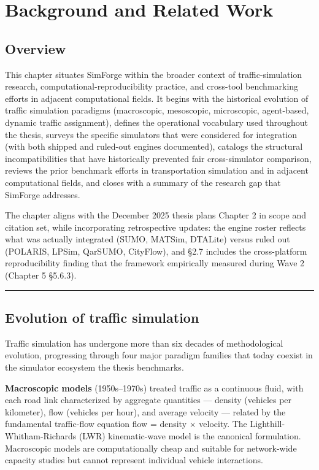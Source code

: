 \chapter{Background and Related
Work}\label{chapter-2-background-and-related-work}

\section{Overview}\label{20-overview}

This chapter situates SimForge within the broader context of
traffic-simulation research, computational-reproducibility practice, and
cross-tool benchmarking efforts in adjacent computational fields. It
begins with the historical evolution of traffic simulation paradigms
(macroscopic, mesoscopic, microscopic, agent-based, dynamic traffic
assignment), defines the operational vocabulary used throughout the
thesis, surveys the specific simulators that were considered for
integration (with both shipped and ruled-out engines documented),
catalogs the structural incompatibilities that have historically
prevented fair cross-simulator comparison, reviews the prior benchmark
efforts in transportation simulation and in adjacent computational
fields, and closes with a summary of the research gap that SimForge
addresses.

The chapter aligns with the December 2025 thesis
plan\textquotesingle s Chapter 2 in scope and citation set, while
incorporating retrospective updates: the engine roster reflects what was
actually integrated (SUMO, MATSim, DTALite) versus ruled out (POLARIS,
LPSim, QarSUMO, CityFlow), and §2.7 includes the cross-platform
reproducibility finding that the framework empirically measured during
Wave 2 (Chapter 5 §5.6.3).

\begin{center}\rule{0.5\linewidth}{0.5pt}\end{center}

\section{Evolution of traffic
simulation}\label{21-evolution-of-traffic-simulation}

Traffic simulation has undergone more than six decades of methodological
evolution, progressing through four major paradigm families that today
coexist in the simulator ecosystem the thesis benchmarks.

\textbf{Macroscopic models} (1950s--1970s) treated traffic as a
continuous fluid, with each road link characterized by aggregate
quantities --- density (vehicles per kilometer), flow (vehicles per
hour), and average velocity --- related by the fundamental traffic-flow
equation flow = density × velocity. The Lighthill- Whitham-Richards
(LWR) kinematic-wave model is the canonical formulation. Macroscopic
models are computationally cheap and suitable for network-wide capacity
studies but cannot represent individual vehicle interactions.

